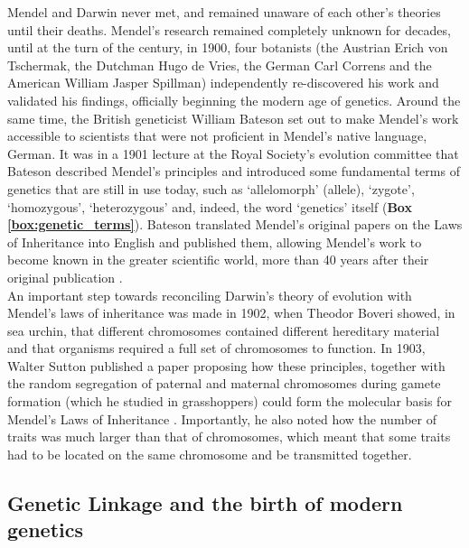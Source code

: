 Mendel and Darwin never met, and remained unaware of each other’s theories until their deaths. 
Mendel’s research remained completely unknown for decades, until at the turn of the century, in 1900, four botanists (the Austrian Erich von Tschermak, the Dutchman Hugo de Vries, the German Carl Correns and the American William Jasper Spillman) independently re-discovered his work and validated his findings, officially beginning the modern age of genetics.
Around the same time, the British geneticist William Bateson set out to make Mendel’s work accessible to scientists that were not proficient in Mendel’s native language, German.
It was in a 1901 lecture at the Royal Society's evolution committee that Bateson described Mendel's principles and introduced some fundamental terms of genetics that are still in use today, such as `allelomorph' (allele), `zygote', `homozygous', `heterozygous' and, indeed, the word `genetics' itself (\textbf{Box \ref{box:genetic_terms}}).
Bateson translated Mendel’s original papers on the Laws of Inheritance into English and published them, allowing Mendel’s work to become known in the greater scientific world, more than 40 years after their original publication \cite{bateson2013mendel}.\\ 

An important step towards reconciling Darwin’s theory of evolution with Mendel’s laws of inheritance was made in 1902, when Theodor Boveri showed, in sea urchin, that different chromosomes contained different hereditary material and that organisms required a full set of chromosomes to function. 
In 1903, Walter Sutton published a paper proposing how these principles, together with the random segregation of paternal and maternal chromosomes during gamete formation (which he studied in grasshoppers) could form the molecular basis for Mendel’s Laws of Inheritance \cite{sutton1903chromosomes}. 
Importantly, he also noted how the number of traits was much larger than that of chromosomes, which meant that some traits had to be located on the same chromosome and be transmitted together.

\subsection{Genetic Linkage and the birth of modern genetics} %
\label{sec:Morgan}


